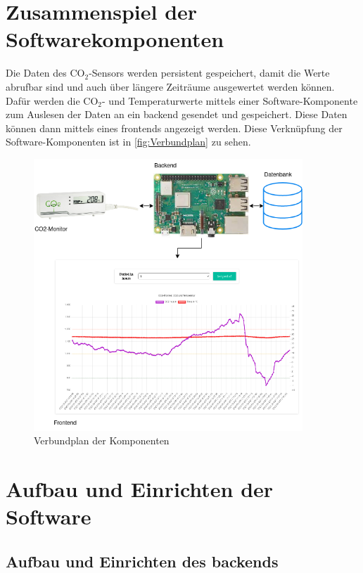 \documentclass[a4paper,
    11pt,
    headings=small,
    ngerman,
    listof=totoc,
    numbers=noenddot]{scrreprt}[2021/11/13]
\begin{document}
\section{Zusammenspiel der Softwarekomponenten}

Die Daten des CO$_2$-Sensors werden persistent gespeichert, damit die Werte abrufbar sind und auch über längere Zeiträume ausgewertet werden können. Dafür werden die CO$_2$- und Temperaturwerte mittels einer Software-Komponente zum Auslesen der Daten an ein \gls{backend} gesendet und gespeichert. Diese Daten können dann mittels eines \gls{frontend}s angezeigt werden. Diese Verknüpfung der Software-Komponenten ist in \vref{fig:Verbundplan} zu sehen.

\begin{figure}[htbp]
  \centering
  \includegraphics[width=0.9\textwidth]{pictures/SoftwareZusammenspiel.png}
  \caption{Verbundplan der Komponenten}
  \label{fig:Verbundplan}
\end{figure}


\section{Aufbau und Einrichten der Software}

\subsection{Aufbau und Einrichten des \gls{backend}s}
\end{document}
